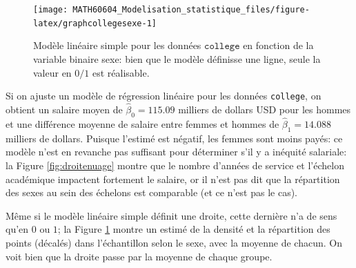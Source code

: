 \documentclass[
  11pt,
  letterpaper,
]{article}
\theoremstyle{definition}
\theoremstyle{definition}
\theoremstyle{definition}
\theoremstyle{definition}
\theoremstyle{remark}
\begin{document}
\begin{figure}

{\centering \texttt{[image: MATH60604\_Modelisation\_statistique\_files/figure-latex/graphcollegesexe-1]} 

}

\caption{Modèle linéaire simple pour les données $\texttt{college}$ en fonction de la variable binaire sexe: bien que le modèle définisse une ligne, seule la valeur en $0/1$ est réalisable.}\label{fig:graphcollegesexe}
\end{figure}

Si on ajuste un modèle de régression linéaire pour les données \texttt{college}, on obtient un salaire moyen de \(\widehat{\beta}_0=115.09\) milliers de dollars USD pour les hommes et une différence moyenne de salaire entre femmes et hommes de \(\widehat{\beta}_1=14.088\) milliers de dollars. Puisque l'estimé est négatif, les femmes sont moins payés: ce modèle n'est en revanche pas suffisant pour déterminer s'il y a inéquité salariale: la Figure \ref{fig:droitenuage} montre que le nombre d'années de service et l'échelon académique impactent fortement le salaire, or il n'est pas dit que la répartition des sexes au sein des échelons est comparable (et ce n'est pas le cas).

Même si le modèle linéaire simple définit une droite, cette dernière n'a de sens qu'en \(0\) ou \(1\); la Figure \ref{fig:graphcollegesexe} montre un estimé de la densité et la répartition des points (décalés) dans l'échantillon selon le sexe, avec la moyenne de chacun. On voit bien que la droite passe par la moyenne de chaque groupe.
\end{document}
